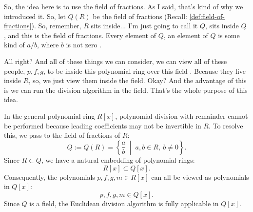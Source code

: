 \begin{proofWrapper}
\begin{speech}[00:18:50 - 00:21:05]
So, the idea here is to use the field of fractions. As I said, that's kind of why we introduced it. So, let $Q(R)$ be the field of fractions  (Recall: \cref{def:field-of-fractions}). So, remember, $R$ sits inside... I'm just going to call it $Q$, sits inside $Q$ , and this is the field of fractions. Every element of $Q$, an element of $Q$ is some kind of $a/b$, where $b$ is not zero .

All right? And all of these things we can consider, we can view all of these people, $p, f, g$, to be inside this polynomial ring over this field . Because they live inside $R$, so, we just view them inside the field. Okay? And the advantage of this is we can run the division algorithm in the field. That's the whole purpose of this idea.
\end{speech}

\begin{content}
In the general polynomial ring $R[x]$, polynomial division with remainder cannot be performed because leading coefficients may not be invertible in $R$. To resolve this, we pass to the field of fractions of $R$:
\begin{equation}\label{eq:field-of-fractions-def-w7tue}
Q := Q(R) = \left\{ \frac{a}{b} \;\middle|\; a, b \in R, \ b \neq 0 \right\}.
\end{equation}
Since $R \subset Q$, we have a natural embedding of polynomial rings:
\[
R[x] \subset Q[x].
\]
Consequently, the polynomials $p, f, g, m \in R[x]$ can all be viewed as polynomials in $Q[x]$:
\begin{equation}\label{eq:polynomials-in-Qx}
p, f, g, m \in Q[x].
\end{equation}
Since $Q$ is a field, the Euclidean division algorithm is fully applicable in $Q[x]$.
\end{content}

\begin{hidden}
\end{hidden}


\end{proofWrapper}
